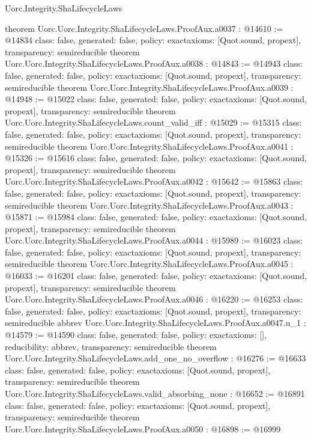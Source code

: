 \begin{lexlean}{Uorc.Integrity.ShaLifecycleLaws}
\begin{coremodule}
{}
theorem Uorc.Uorc.Integrity.ShaLifecycleLaws.ProofAux.a0037 : @14610 := @14834 {
  class: false,
  generated: false,
  policy: exact{axioms: [Quot.sound, propext]},
  transparency: semireducible
}
theorem Uorc.Uorc.Integrity.ShaLifecycleLaws.ProofAux.a0038 : @14843 := @14943 {
  class: false,
  generated: false,
  policy: exact{axioms: [Quot.sound, propext]},
  transparency: semireducible
}
theorem Uorc.Uorc.Integrity.ShaLifecycleLaws.ProofAux.a0039 : @14948 := @15022 {
  class: false,
  generated: false,
  policy: exact{axioms: [Quot.sound, propext]},
  transparency: semireducible
}
theorem Uorc.Uorc.Integrity.ShaLifecycleLaws.count_valid_iff : @15029 := @15315 {
  class: false,
  generated: false,
  policy: exact{axioms: [Quot.sound, propext]},
  transparency: semireducible
}
theorem Uorc.Uorc.Integrity.ShaLifecycleLaws.ProofAux.a0041 : @15326 := @15616 {
  class: false,
  generated: false,
  policy: exact{axioms: [Quot.sound, propext]},
  transparency: semireducible
}
theorem Uorc.Uorc.Integrity.ShaLifecycleLaws.ProofAux.a0042 : @15642 := @15863 {
  class: false,
  generated: false,
  policy: exact{axioms: [Quot.sound, propext]},
  transparency: semireducible
}
theorem Uorc.Uorc.Integrity.ShaLifecycleLaws.ProofAux.a0043 : @15871 := @15984 {
  class: false,
  generated: false,
  policy: exact{axioms: [Quot.sound, propext]},
  transparency: semireducible
}
theorem Uorc.Uorc.Integrity.ShaLifecycleLaws.ProofAux.a0044 : @15989 := @16023 {
  class: false,
  generated: false,
  policy: exact{axioms: [Quot.sound, propext]},
  transparency: semireducible
}
theorem Uorc.Uorc.Integrity.ShaLifecycleLaws.ProofAux.a0045 : @16033 := @16201 {
  class: false,
  generated: false,
  policy: exact{axioms: [Quot.sound, propext]},
  transparency: semireducible
}
theorem Uorc.Uorc.Integrity.ShaLifecycleLaws.ProofAux.a0046 : @16220 := @16253 {
  class: false,
  generated: false,
  policy: exact{axioms: [Quot.sound, propext]},
  transparency: semireducible
}
abbrev Uorc.Uorc.Integrity.ShaLifecycleLaws.ProofAux.a0047.{u_1} : @14579 := @14590 {
  class: false,
  generated: false,
  policy: exact{axioms: []},
  reducibility: abbrev{},
  transparency: semireducible
}
theorem Uorc.Uorc.Integrity.ShaLifecycleLaws.add_one_no_overflow : @16276 := @16633 {
  class: false,
  generated: false,
  policy: exact{axioms: [Quot.sound, propext]},
  transparency: semireducible
}
theorem Uorc.Uorc.Integrity.ShaLifecycleLaws.valid_absorbing_none : @16652 := @16891 {
  class: false,
  generated: false,
  policy: exact{axioms: [Quot.sound, propext]},
  transparency: semireducible
}
theorem Uorc.Uorc.Integrity.ShaLifecycleLaws.ProofAux.a0050 : @16898 := @16999 {
}
\end{coremodule}
\end{lexlean}
